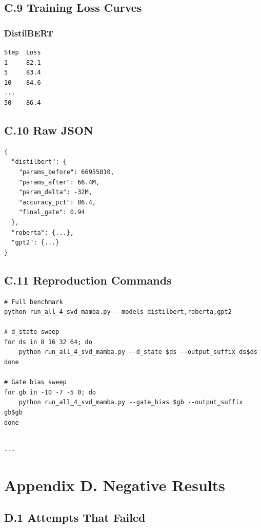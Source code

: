 \subsection{C.9 Training Loss Curves}

\subsubsection{DistilBERT}
\begin{lstlisting}
Step  Loss
1     82.1
5     83.4
10    84.6
...
50    86.4
\end{lstlisting}

\subsection{C.10 Raw JSON}

\begin{lstlisting}
{
  "distilbert": {
    "params_before": 66955010,
    "params_after": 66.4M,
    "param_delta": -32M,
    "accuracy_pct": 86.4,
    "final_gate": 0.94
  },
  "roberta": {...},
  "gpt2": {...}
}
\end{lstlisting}

\subsection{C.11 Reproduction Commands}

\begin{lstlisting}
# Full benchmark
python run_all_4_svd_mamba.py --models distilbert,roberta,gpt2

# d_state sweep
for ds in 8 16 32 64; do
    python run_all_4_svd_mamba.py --d_state $ds --output_suffix ds$ds
done

# Gate bias sweep
for gb in -10 -7 -5 0; do
    python run_all_4_svd_mamba.py --gate_bias $gb --output_suffix gb$gb
done
\end{lstlisting}
\begin{lstlisting}

---
\end{lstlisting}


\section{Appendix D. Negative Results}

\subsection{D.1 Attempts That Failed}

